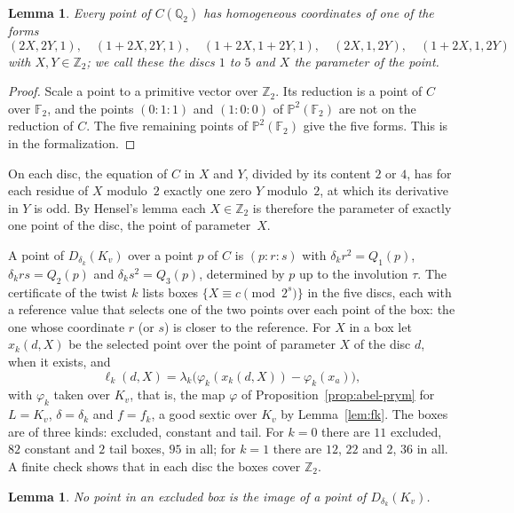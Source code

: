 \documentclass[11pt]{amsart}
\newtheorem{lemma}[theorem]{Lemma}
\theoremstyle{definition}
\numberwithin{equation}{section}
\newcommand{\F}{\mathbb{F}}
\newcommand{\Qt}{\mathbb{Q}_2}
\newcommand{\Zt}{\mathbb{Z}_2}
\newcommand{\kv}{K_v}
\newcommand{\lean}[1]{\ignorespaces}
\begin{document}
\begin{lemma}\label{lem:discs}\lean{FurioLombardo.Discharge.M4Cert.exists_disc, FurioLombardo.Discharge.M4Cert.liftTwist_Mmat}
Every point of $C(\Qt)$ has homogeneous coordinates of one of the forms
\[
(2X,2Y,1),\quad(1+2X,2Y,1),\quad(1+2X,1+2Y,1),\quad(2X,1,2Y),\quad(1+2X,1,2Y)
\]
with $X,Y\in\Zt$; we call these the discs $1$ to $5$ and $X$ the parameter of the point.
\end{lemma}

\begin{proof}
Scale a point to a primitive vector over $\Zt$. Its reduction is a point of $C$ over $\F_2$, and the points $(0:1:1)$ and $(1:0:0)$ of $\mathbb P^2(\F_2)$ are not on the reduction of $C$. The five remaining points of $\mathbb P^2(\F_2)$ give the five forms. This is  in the formalization.
\end{proof}

On each disc, the equation of $C$ in $X$ and $Y$, divided by its content $2$ or $4$, has for each residue of $X$ modulo~$2$ exactly one zero $Y$ modulo~$2$, at which its derivative in $Y$ is odd. By Hensel's lemma each $X\in\Zt$ is therefore the parameter of exactly one point of the disc, the point of parameter~$X$.

A point of $D_{\delta_k}(\kv)$ over a point $p$ of $C$ is
 $(p:r:s)$ with $\delta_kr^2=Q_1(p)$, $\delta_krs=Q_2(p)$ and $\delta_ks^2=Q_3(p)$, determined by $p$ up to the involution $\tau$. The certificate of the twist $k$ lists boxes $\{X\equiv c\pmod{2^s}\}$ in the five discs, each with a reference value that selects one of the two points over each point of the box: the one whose coordinate $r$ (or $s$) is closer to the reference. For $X$ in a box let $x_k(d,X)$ be the selected point over the point of parameter $X$ of the disc $d$, when it exists, and
\[
\ell_k(d,X)=\lambda_k\bigl(\varphi_k(x_k(d,X))-\varphi_k(x_a)\bigr),
\]
with $\varphi_k$ taken over $\kv$, that is, the map $\varphi$ of Proposition~\ref{prop:abel-prym} for $L=\kv$, $\delta=\delta_k$ and $f=f_k$, a good sextic over $\kv$ by Lemma~\ref{lem:fk}. The boxes are of three kinds: excluded, constant and tail. For $k=0$ there are $11$ excluded, $82$ constant and $2$ tail boxes, $95$ in all; for $k=1$ there are $12$, $22$ and $2$, $36$ in all. A finite check shows that in each disc the boxes cover $\Zt$.

\begin{lemma}\label{lem:exclusion}\lean{FurioLombardo.Discharge.M4Cert.hExcl_T0_Mmat, FurioLombardo.Discharge.M4Cert.hExcl_T1_Mmat}
No point in an excluded box is the image of a point of $D_{\delta_k}(\kv)$.
\end{lemma}
\end{document}
